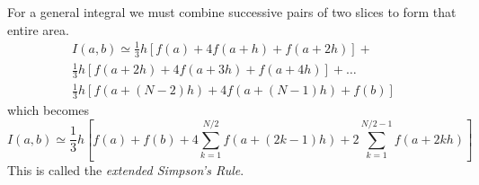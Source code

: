             \newline \indent
            For a general integral we must combine successive pairs of two slices to form that entire area.
            \begin{align*}
                I(a, b) \simeq \frac{1}{3}h[f(a) + 4f(a + h) + f(a + 2h)] + \\
                    \frac{1}{3}h[f(a + 2h) + 4f(a + 3h) + f(a + 4h)] + \dots \\
                    \frac{1}{3}h[f(a + (N - 2)h) + 4f(a + (N - 1)h) + f(b)]
            \end{align*}
            which becomes
            \begin{equation*}
                I(a, b) \simeq \frac{1}{3}h[f(a) + f(b) + 4\sum_{k=1}^{N/2}f(a + (2k - 1)h) + 2\sum_{k=1}^{N/2 - 1}f(a + 2kh)]
            \end{equation*}
            This is called the \textit{extended Simpson's Rule}.